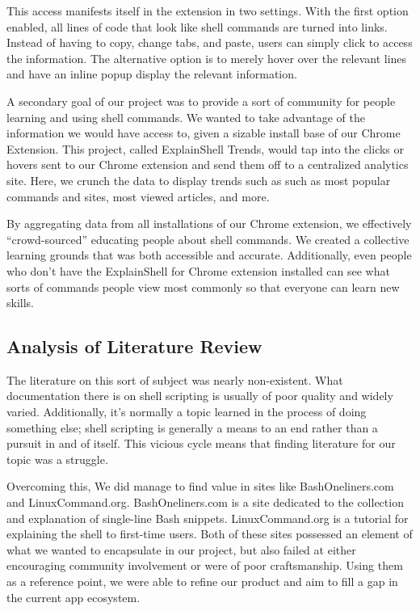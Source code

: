 \documentclass[11pt]{article}
\begin{document}
This access manifests itself in the extension in two settings. With the first
option enabled, all lines of code that look like shell commands are turned into
links. Instead of having to copy, change tabs, and paste, users can simply
click to access the information. The alternative option is to merely hover over
the relevant lines and have an inline popup display the relevant information.

A secondary goal of our project was to provide a sort of community for people
learning and using shell commands. We wanted to take advantage of the
information we would have access to, given a sizable install base of our Chrome
Extension. This project, called ExplainShell Trends, would tap into the
clicks or hovers sent to our Chrome extension and send them off to a
centralized analytics site. Here, we crunch the data to display trends such as
such as most popular commands and sites, most viewed articles, and more.

By aggregating data from all installations of our Chrome extension, we
effectively ``crowd-sourced'' educating people about shell commands. We created
a collective learning grounds that was both accessible and accurate.
Additionally, even people who don't have the ExplainShell for Chrome extension
installed can see what sorts of commands people view most commonly so that
everyone can learn new skills.

\subsection{Analysis of Literature Review}

The literature on this sort of subject was nearly non-existent. What
documentation there is on shell scripting is usually of poor quality and widely
varied. Additionally, it's normally a topic learned in the process of doing
something else; shell scripting is generally a means to an end rather than a
pursuit in and of itself. This vicious cycle means that finding literature for
our topic was a struggle.

Overcoming this, We did manage to find value in sites like BashOneliners.com
and LinuxCommand.org. BashOneliners.com is a site dedicated to the collection
and explanation of single-line Bash snippets. LinuxCommand.org is a tutorial
for explaining the shell to first-time users. Both of these sites possessed an
element of what we wanted to encapsulate in our project, but also failed at
either encouraging community involvement or were of poor craftsmanship. Using
them as a reference point, we were able to refine our product and aim to fill a
gap in the current app ecosystem.
\end{document}
